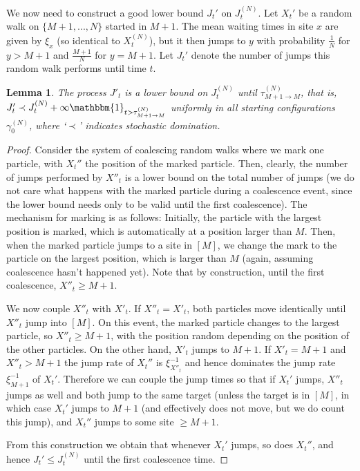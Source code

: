 \documentclass[11pt,a4paper]{scrartcl}
\numberwithin{equation}{section}
\theoremstyle{plain}
\newtheorem{lemma}[theorem]{Lemma}
\theoremstyle{definition}
\theoremstyle{remark}
\newcommand{\ind}{\ensuremath{\mathbbm{1}}}
\newcommand{\super}[1]{{(#1)}}
\begin{document}
We now need to construct a good lower bound $J_t'$ on $J_t^\super{N}$. Let $X_t'$ be a random walk on $\{M+1,...,N\}$ started in $M+1$. The mean waiting times in site $x$ are given by $\xi_x$ (so identical to $X_t^\super{N}$), but it then jumps to $y$ with probability $\frac1N$ for $y>M+1$ and $\frac{M+1}{N}$ for $y=M+1$. Let $J_t'$ denote the number of jumps this random walk performs until time $t$.
\begin{lemma}
	The process $J'_t$ is a lower bound on $J^\super{N}_t$ until $\tau^\super{N}_{M+1\to M}$, that is, $J'_t \prec J^\super{N}_t + \infty\ind_{t> \tau^\super{N}_{M+1\to M}}$ uniformly in all starting configurations $\gamma_0^{(N)}$, where `$\prec$' indicates stochastic domination.
\end{lemma}
\begin{proof}
	Consider the system of coalescing random walks where we mark one particle, with $X_t''$ the position of the marked particle. Then, clearly, the number of jumps performed by $X''_t$ is a lower bound on the total number of jumps (we do not care what happens with the marked particle during a coalescence event, since the lower bound needs only to be valid until the first coalescence). The mechanism for marking is as follows: Initially, the particle with the largest position is marked, which is automatically at a position larger than $M$. Then, when the marked particle jumps to a site in $[M]$, we change the mark to the particle on the largest position, which is larger than $M$ (again, assuming coalescence hasn't happened yet). Note that by construction, until the first coalescence, $X''_t\geq M+1$.
	
	We now couple $X''_t$ with $X'_t$. If $X''_t = X'_t$, both particles move identically until $X''_t$ jump into $[M]$. On this event, the marked particle changes to the largest particle, so $X''_t \geq M+1$, with the position random depending on the position of the other particles. On the other hand, $X'_t$ jumps to $M+1$. If $X'_t = M+1$ and $X''_t>M+1$ the jump rate of $X_t''$ is $\xi_{X''_t}^{-1}$ and hence dominates the jump rate $\xi_{M+1}^{-1}$ of $X_t'$. Therefore we can couple the jump times so that if $X_t'$ jumps, $X''_t$ jumps as well and both jump to the same target (unless the target is in $[M]$, in which case $X_t'$ jumps to $M+1$ (and effectively does not move, but we do count this jump), and $X_t''$ jumps to some site $\geq M+1$.
	
	From this construction we obtain that whenever $X_t'$ jumps, so does $X_t''$, and hence $J_t'\leq J_t^\super{N}$ until the first coalescence time.
\end{proof}
\end{document}
